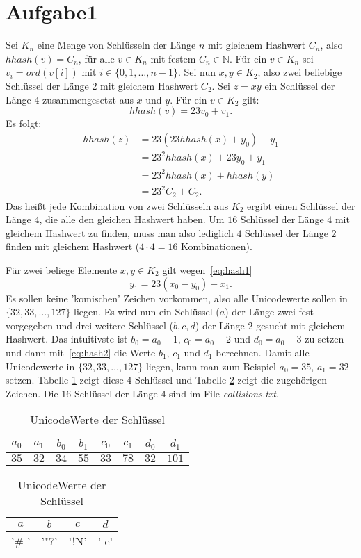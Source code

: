 \documentclass[a4paper]{article}
\begin{document}

\section*{Aufgabe1}
Sei $K_n$ eine Menge von Schlüsseln der Länge $n$ mit gleichem Hashwert $C_n$, also $hhash(v)=C_n$, für alle $v\in K_n$ mit festem $C_n\in\mathbb{N}$. Für ein $v\in K_n$ sei $v_i=ord(v[i])$ mit $i\in\{0,1,\dots,n-1\}$. Sei nun $x,y\in K_2$, also zwei beliebige Schlüssel der Länge $2$ mit gleichem Hashwert $C_2$. Sei $z=xy$ ein Schlüssel der Länge $4$ zusammengesetzt aus $x$ und $y$. Für ein $v\in K_2$ gilt:
\begin{equation}
hhash(v)=23v_0 + v_1.\label{eq:hash1}
\end{equation} 
Es folgt:
\begin{align}
hhash(z) & = 23(23hhash(x)+y_0) + y_1\\
& = 23^2hhash(x)+23y_0+y_1\\
& = 23^2hhash(x)+hhash(y)\\
& = 23^2C_2+C_2.
\end{align}
Das heißt jede Kombination von zwei Schlüsseln aus $K_2$ ergibt einen Schlüssel der Länge $4$, die alle den gleichen Hashwert haben. Um $16$ Schlüssel der Länge $4$ mit gleichem Hashwert zu finden, muss man also lediglich $4$ Schlüssel der Länge $2$ finden mit gleichem Hashwert ($4\cdot4=16$ Kombinationen).

Für zwei beliege Elemente $x,y\in K_2$ gilt wegen~\eqref{eq:hash1}
\begin{equation}
y_1=23(x_0-y_0)+x_1.\label{eq:hash2}
\end{equation}
Es sollen keine 'komischen' Zeichen vorkommen, also alle Unicodewerte sollen in $\{32,33,\dots,127\}$ liegen. Es wird nun ein Schlüssel ($a$) der Länge zwei fest vorgegeben und drei weitere Schlüssel ($b,c,d$) der Länge $2$ gesucht mit gleichem Hashwert.  Das intuitivste ist $b_0=a_0-1$, $c_0=a_0-2$ und $d_0=a_0-3$ zu setzen und dann mit~\eqref{eq:hash2} die Werte $b_1$, $c_1$ und $d_1$ berechnen. Damit alle Unicodewerte in $\{32,33,\dots,127\}$ liegen, kann man zum Beispiel $a_0=35$, $a_1=32$ setzen. Tabelle \ref{tab:unicode} zeigt diese $4$ Schlüssel und Tabelle \ref{tab:string} zeigt die zugehörigen Zeichen. Die $16$ Schlüssel der Länge $4$ sind im File \emph{collisions.txt}.


\begin{table}[H]
\centering
\begin{tabular}{|c|c|c|c|c|c|c|c|}
\hline
$a_0$ & $a_1$ & $b_0$ & $b_1$ & $c_0$ & $c_1$ & $d_0$ & $d_1$ \\\hline
$35$ & $32$ & $34$ & $55$ & $33$ & $78$ & $32$ & $101$
\end{tabular}
\caption{UnicodeWerte der Schlüssel}
\label{tab:unicode}
\end{table}


\begin{table}[H]
\centering
\begin{tabular}{|c|c|c|c|}
\hline
$a$ & $b$ & $c$ & $d$ \\\hline
'\# '& '"7' & '!N' & ' e'
\end{tabular}
\caption{UnicodeWerte der Schlüssel}
\label{tab:string}
\end{table}
\end{document}
